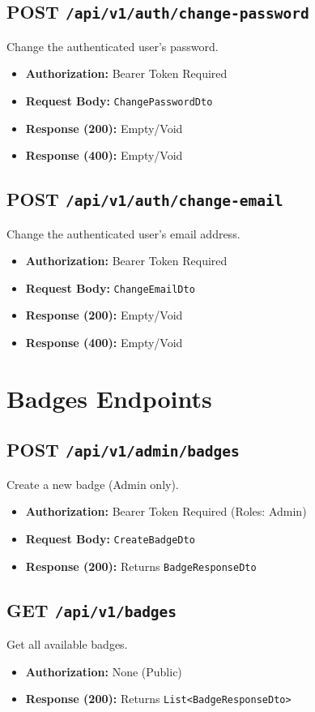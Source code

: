 \subsection{POST \texttt{/api/v1/auth/change-password}}
Change the authenticated user's password.
\begin{itemize}
    \item \textbf{Authorization:} Bearer Token Required
    \item \textbf{Request Body:} \texttt{ChangePasswordDto}
    \item \textbf{Response (200):} Empty/Void
    \item \textbf{Response (400):} Empty/Void
\end{itemize}

\subsection{POST \texttt{/api/v1/auth/change-email}}
Change the authenticated user's email address.
\begin{itemize}
    \item \textbf{Authorization:} Bearer Token Required
    \item \textbf{Request Body:} \texttt{ChangeEmailDto}
    \item \textbf{Response (200):} Empty/Void
    \item \textbf{Response (400):} Empty/Void
\end{itemize}

\section{Badges Endpoints}

\subsection{POST \texttt{/api/v1/admin/badges}}
Create a new badge (Admin only).
\begin{itemize}
    \item \textbf{Authorization:} Bearer Token Required (Roles: Admin)
    \item \textbf{Request Body:} \texttt{CreateBadgeDto}
    \item \textbf{Response (200):} Returns \texttt{BadgeResponseDto}
\end{itemize}

\subsection{GET \texttt{/api/v1/badges}}
Get all available badges.
\begin{itemize}
    \item \textbf{Authorization:} None (Public)
    \item \textbf{Response (200):} Returns \texttt{List<BadgeResponseDto>}
\end{itemize}

